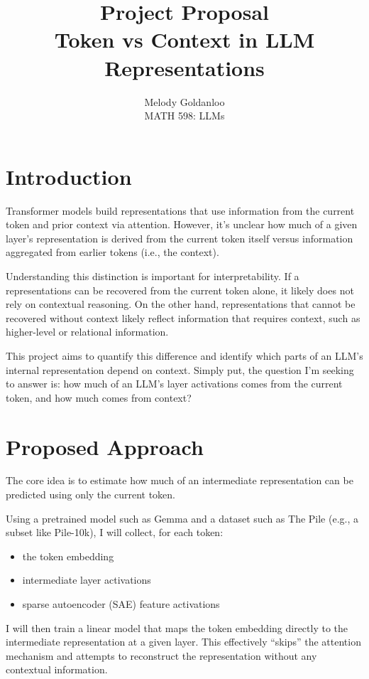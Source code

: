 \documentclass[12pt]{article}
\title{Project Proposal\\[1ex] Token vs Context in LLM Representations}
\author{Melody Goldanloo\\[2ex] MATH 598: LLMs}
\date{}
\begin{document}
\maketitle
\thispagestyle{fancy}

\section{Introduction}

Transformer models build representations that use information from the current token and prior context via attention. However, it's unclear how much of a given layer's representation is derived from the current token itself versus information aggregated from earlier tokens (i.e., the context).

Understanding this distinction is important for interpretability. If a representations can be recovered from the current token alone, it likely does not rely on contextual reasoning. On the other hand, representations that cannot be recovered without context likely reflect information that requires context, such as higher-level or relational information.

This project aims to quantify this difference and identify which parts of an LLM's internal representation depend on context. Simply put, the question I'm seeking to answer is: how much of an LLM’s layer activations comes from the current token, and how much comes from context?

\section{Proposed Approach}

The core idea is to estimate how much of an intermediate representation can be predicted using only the current token.

Using a pretrained model such as Gemma and a dataset such as The Pile (e.g., a subset like Pile-10k), I will collect, for each token:
\begin{itemize}
    \item the token embedding
    \item intermediate layer activations
    \item sparse autoencoder (SAE) feature activations
\end{itemize}

I will then train a linear model that maps the token embedding directly to the intermediate representation at a given layer. This effectively ``skips'' the attention mechanism and attempts to reconstruct the representation without any contextual information.
\end{document}
